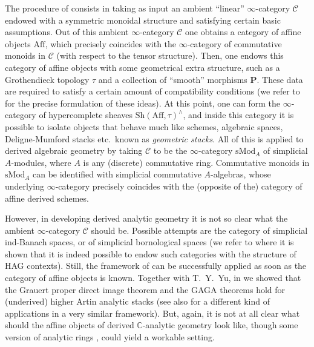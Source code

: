 \documentclass[12pt,a4paper,reqno]{amsart}
\theoremstyle{plain}
\theoremstyle{definition}
\theoremstyle{remark}
\numberwithin{equation}{section}
\begin{document}
The procedure of \cite{HAG-II} consists in taking as input an ambient ``linear'' $\infty$-category ${\mathcal C}$ endowed with a symmetric monoidal structure and satisfying certain basic assumptions. Out of this ambient $\infty$-category ${\mathcal C}$ one obtains a category of affine objects $\mathrm{Aff}$, which precisely coincides with the $\infty$-category of commutative monoids in ${\mathcal C}$ (with respect to the tensor structure). Then, one endows this category of affine objects with some geometrical extra structure, such as a Grothendieck topology $\tau$ and a collection of ``smooth'' morphisms $\mathbf P$. These data are required to satisfy a certain amount of compatibility conditions (we refer to \cite[Â§ 1.3.2]{HAG-II} for the precise formulation of these ideas).
At this point, one can form the $\infty$-category of hypercomplete sheaves ${\mathrm{Sh}}(\mathrm{Aff}, \tau)^\wedge$, and inside this category it is possible to isolate objects that behave much like schemes, algebraic spaces, {Deligne-Mumford\xspace} stacks etc.\ known as \emph{geometric stacks}.
All of this is applied to derived algebraic geometry by taking ${\mathcal C}$ to be the $\infty$-category $\mathrm{sMod}_A$ of simplicial $A$-modules, where $A$ is any (discrete) commutative ring. Commutative monoids in $\mathrm{sMod}_A$ can be identified with simplicial commutative $A$-algebras, whose underlying $\infty$-category precisely coincides with the (opposite of the) category of affine derived schemes.

However, in developing derived analytic geometry it is not so clear what the ambient $\infty$-category ${\mathcal C}$ should be. Possible attempts are the category of simplicial ind-Banach spaces, or of simplicial bornological spaces (we refer to \cite{Bambozzi_Ben_Bassat_Dagger_2015} where it is shown that it is indeed possible to endow such categories with the structure of HAG contexts).
Still, the framework of \cite{HAG-II} can be successfully applied as soon as the category of affine objects is known. Together with T.\ Y.\ Yu, in \cite{Porta_Yu_Higher_analytic_stacks_2014} we showed that the Grauert proper direct image theorem and the GAGA theorems hold for (underived) higher Artin analytic stacks (see also \cite{Toen_Algebrisation_2008} for a different kind of applications in a very similar framework).
But, again, it is not at all clear what should the affine objects of derived {$\mathbb C$-analytic\xspace} geometry look like, though some version of analytic rings \cite{Dubuc_Taubin}, could yield a workable setting.
\end{document}
